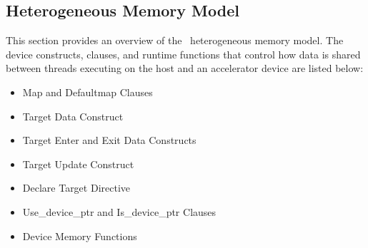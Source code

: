
\subsection{Heterogeneous Memory Model}
\label{ssec:06.heterogeneous-memory-model}

This section provides an overview of the \OMP\ heterogeneous memory model.
The device constructs, clauses, and runtime functions that control how data is shared
between threads executing on the host and an accelerator device are listed below:

\begin{itemize}
  \item Map and Defaultmap Clauses
  \item Target Data Construct
  \item Target Enter and Exit Data Constructs
  \item Target Update Construct
  \item Declare Target Directive
  \item Use\_device\_ptr and Is\_device\_ptr Clauses
  \item Device Memory Functions
\end{itemize}

